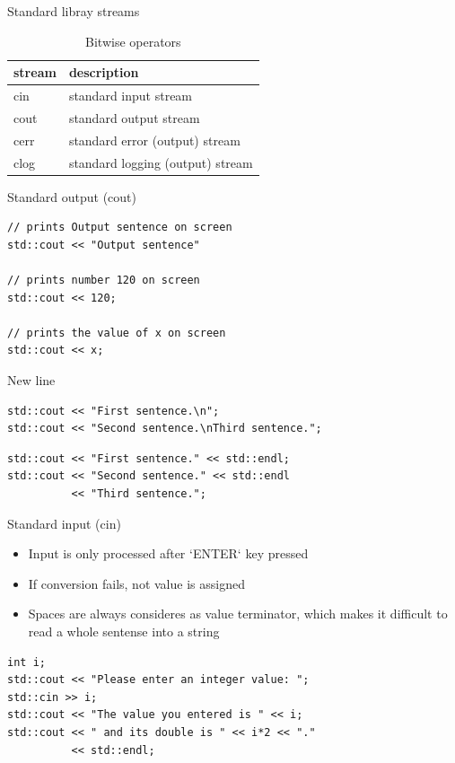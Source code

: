 \documentclass{beamer}
\begin{document}
\begin{frame}{Standard libray streams}
\begin{table}
\begin{tabular}{l | l}
stream & description \\
\hline
cin & standard input stream \\
cout & standard output stream \\
cerr & standard error (output) stream \\
clog & standard logging (output) stream \\
\end{tabular}
\caption{Bitwise operators}
\end{table}
\end{frame}

\begin{frame}[fragile]{Standard output (cout)}
\begin{lstlisting}[caption=Standard output]
// prints Output sentence on screen
std::cout << "Output sentence" 

// prints number 120 on screen
std::cout << 120;

// prints the value of x on screen
std::cout << x;
\end{lstlisting}
\end{frame}

\begin{frame}[fragile]{New line}
\begin{lstlisting}[caption=Use ASCII newline character]
std::cout << "First sentence.\n";
std::cout << "Second sentence.\nThird sentence.";
\end{lstlisting}

\begin{lstlisting}[caption=Use portable endl]
std::cout << "First sentence." << std::endl;
std::cout << "Second sentence." << std::endl
          << "Third sentence.";
\end{lstlisting}
\end{frame}

\begin{frame}[fragile]{Standard input (cin)}
\begin{itemize}
\item Input is only processed after `ENTER` key pressed
\item If conversion fails, not value is assigned
\item Spaces are always consideres as value terminator, which makes it difficult
to read a whole sentense into a string
\end{itemize}

\begin{lstlisting}[caption=Standard input]
int i;
std::cout << "Please enter an integer value: ";
std::cin >> i;
std::cout << "The value you entered is " << i;
std::cout << " and its double is " << i*2 << "." 
          << std::endl;
\end{lstlisting}
\end{frame}
\end{document}
